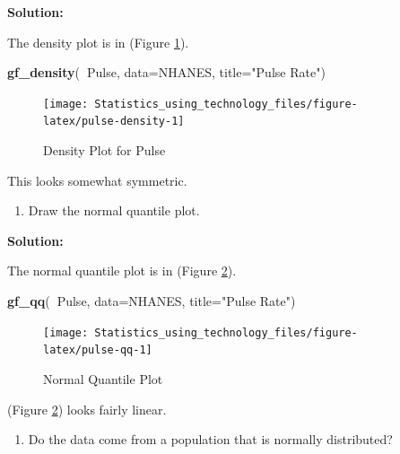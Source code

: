 \documentclass[
]{book}
\newenvironment{Shaded}{\begin{snugshade}}{\end{snugshade}}
\newcommand{\DataTypeTok}[1]{\textcolor[rgb]{0.13,0.29,0.53}{#1}}
\newcommand{\KeywordTok}[1]{\textcolor[rgb]{0.13,0.29,0.53}{\textbf{#1}}}
\newcommand{\NormalTok}[1]{#1}
\newcommand{\OperatorTok}[1]{\textcolor[rgb]{0.81,0.36,0.00}{\textbf{#1}}}
\newcommand{\StringTok}[1]{\textcolor[rgb]{0.31,0.60,0.02}{#1}}
\providecommand{\tightlist}{%
  \setlength{\itemsep}{0pt}\setlength{\parskip}{0pt}}
\begin{document}
\textbf{Solution:}

The density plot is in (Figure \ref{fig:pulse-density}).



\begin{Shaded}
\begin{Highlighting}[]
\KeywordTok{gf_density}\NormalTok{(}\OperatorTok{~}\NormalTok{Pulse, }\DataTypeTok{data=}\NormalTok{NHANES, }\DataTypeTok{title=}\StringTok{"Pulse Rate"}\NormalTok{)}
\end{Highlighting}
\end{Shaded}

\begin{figure}
\texttt{[image: Statistics\_using\_technology\_files/figure-latex/pulse-density-1]} \caption{Density Plot for Pulse}\label{fig:pulse-density}
\end{figure}

This looks somewhat symmetric.

\begin{enumerate}
\def\labelenumi{\alph{enumi}.}
\setcounter{enumi}{2}
\tightlist
\item
  Draw the normal quantile plot.
\end{enumerate}

\textbf{Solution:}

The normal quantile plot is in (Figure \ref{fig:pulse-qq}).



\begin{Shaded}
\begin{Highlighting}[]
\KeywordTok{gf_qq}\NormalTok{(}\OperatorTok{~}\NormalTok{Pulse, }\DataTypeTok{data=}\NormalTok{NHANES, }\DataTypeTok{title=}\StringTok{"Pulse Rate"}\NormalTok{)}
\end{Highlighting}
\end{Shaded}

\begin{figure}
\texttt{[image: Statistics\_using\_technology\_files/figure-latex/pulse-qq-1]} \caption{Normal Quantile Plot}\label{fig:pulse-qq}
\end{figure}

(Figure \ref{fig:pulse-qq}) looks fairly linear.

\begin{enumerate}
\def\labelenumi{\alph{enumi}.}
\setcounter{enumi}{4}
\tightlist
\item
  Do the data come from a population that is normally distributed?
\end{enumerate}
\end{document}
